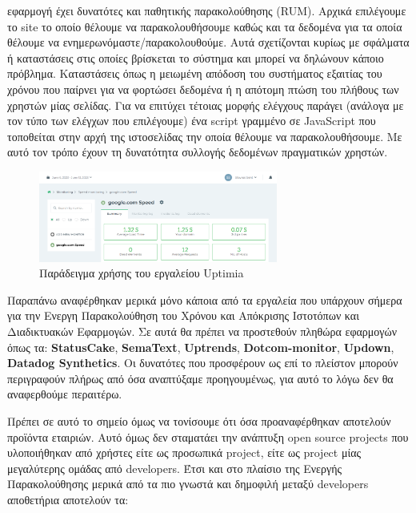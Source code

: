 \begin{itemize}
	      εφαρμογή έχει δυνατότες και παθητικής παρακολούθησης (RUM). Αρχικά επιλέγουμε το site το οποίο θέλουμε να παρακολουθήσουμε
	      καθώς και τα δεδομένα για τα οποία θέλουμε να ενημερωνόμαστε/παρακολουθούμε. Αυτά σχετίζονται κυρίως με σφάλματα ή
	      καταστάσεις στις οποίες βρίσκεται το σύστημα και μπορεί να δηλώνουν κάποιο πρόβλημα. Καταστάσεις όπως η μειωμένη απόδοση του συστήματος
	      εξαιτίας του χρόνου που παίρνει για να φορτώσει δεδομένα ή η απότομη πτώση του πλήθους των χρηστών μίας σελίδας.
	      Για να επιτύχει τέτοιας μορφής ελέγχους παράγει (ανάλογα με τον τύπο των ελέγχων που επιλέγουμε)
	      ένα script γραμμένο σε JavaScript που τοποθείται στην αρχή της ιστοσελίδας την οποία θέλουμε να παρακολουθήσουμε.
	      Με αυτό τον τρόπο έχουν τη δυνατότητα συλλογής δεδομένων πραγματικών χρηστών.
	      \begin{figure}[!ht]
		      \centering
		      \includegraphics[width=0.7\textwidth]{./images/chapter3/uptimia.png}
		      \caption[Παράδειγμα χρήσης του εργαλείου Uptimia]{Παράδειγμα χρήσης του εργαλείου Uptimia}
		      \label{fig:uptimia}
	      \end{figure}
\end{itemize}

\break

Παραπάνω αναφέρθηκαν μερικά μόνο κάποια από τα εργαλεία που υπάρχουν σήμερα για την Ενεργη Παρακολούθηση του Χρόνου
και Απόκρισης Ιστοτόπων και Διαδικτυακών Εφαρμογών. Σε αυτά θα πρέπει να προστεθούν πληθώρα εφαρμογών όπως τα:
\textbf{StatusCake}, \textbf{SemaText}, \textbf{Uptrends}, \textbf{Dotcom-monitor}, \textbf{Updown}, \textbf{Datadog Synthetics}.
Οι δυνατότες που προσφέρουν ως επί το πλείστον μπορούν περιγραφούν πλήρως από όσα αναπτύξαμε προηγουμένως, για αυτό το λόγω δεν θα αναφερθούμε περαιτέρω.

Πρέπει σε αυτό το σημείο όμως να τονίσουμε ότι όσα προαναφέρθηκαν αποτελούν προϊόντα εταιριών.
Αυτό όμως δεν σταματάει την ανάπτυξη open source projects που υλοποιήθηκαν από χρήστες είτε ως προσωπικά project, είτε
ως project μίας μεγαλύτερης ομάδας από developers. Έτσι και στο πλαίσιο της Ενεργής Παρακολούθησης μερικά από τα πιο
γνωστά και δημοφιλή μεταξύ developers αποθετήρια αποτελούν τα:

